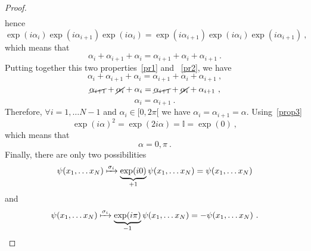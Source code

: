 \begin{proof}
\begin{equation*}
\begin{aligned}
        \end{aligned}
        \end{equation*}
        hence 
        \begin{equation*}
            \exp(i \alpha_i) \exp(i \alpha_{i+1}) \exp(i \alpha_i) = \exp(i \alpha_{i+1}) \exp(i \alpha_i) \exp(i \alpha_{i+1}) ~,
        \end{equation*}
        which means that 
        \begin{equation}\label{pr2}
           \alpha_i + \alpha_{i+1} + \alpha_i = \alpha_{i+1} + \alpha_i + \alpha_{i+1} ~. 
        \end{equation}
        Putting together this two properties~\eqref{pr1} and ~\eqref{pr2}, we have
        \begin{equation*}
            \alpha_i + \alpha_{i+1} + \alpha_i = \alpha_{i+1} + \alpha_i + \alpha_{i+1} ~,
        \end{equation*}
        \begin{equation*}
            \cancel{\alpha_{i+1}} + \cancel{\alpha_i }+ \alpha_i = \cancel{\alpha_{i+1}} + \cancel{\alpha_i} + \alpha_{i+1} ~,
        \end{equation*}
        \begin{equation*}
            \alpha_i = \alpha_{i+1} ~.
        \end{equation*}
        Therefore, $\forall i= 1, \ldots N-1$ and $\alpha_i \in [0, 2\pi[$ we have $\alpha_i = \alpha_{i+1} = \alpha$.
        Using~\eqref{prop3}
        \begin{equation*}
            \exp(i \alpha)^2 = \exp (2 i \alpha) = \mathbb I = \exp(0) ~,
        \end{equation*}
        which means that 
        \begin{equation*}
            \alpha = 0, \pi ~.
        \end{equation*}
        Finally, there are only two possibilities 
        \begin{equation*}
            \psi(x_1, \ldots x_N) \xmapsto{\sigma_i} \underbrace{\exp(i 0)}_{+1} \psi(x_1, \ldots x_N) = \psi(x_1, \ldots x_N)
        \end{equation*}
        and 
        \begin{equation*}
            \psi(x_1, \ldots x_N) \xmapsto{\sigma_i} \underbrace{\exp(i \pi)}_{-1} \psi(x_1, \ldots x_N) = - \psi(x_1, \ldots x_N)~.
        \end{equation*}
    \end{proof}

